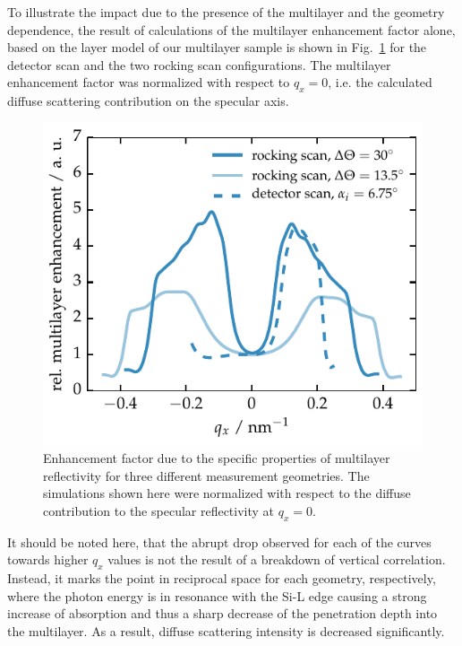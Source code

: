 To illustrate the impact due to the presence of the multilayer and the geometry dependence, the result of calculations of the multilayer enhancement factor alone, based on the layer model of our multilayer sample is shown in Fig.~\ref{ch_diff:fig_PTB17_multilayer_enhancement_factor} for the detector scan and the two rocking scan configurations. The multilayer enhancement factor was normalized with respect to $q_x=0$, i.e. the calculated diffuse scattering contribution on the specular axis.
\begin{figure}[htbp]
	\includegraphics{img/PTB17_multilayer_enhancement_factor} \caption{Enhancement factor due to the specific properties of multilayer reflectivity for three different measurement geometries. The simulations shown here were normalized with respect to the diffuse contribution to the specular reflectivity at $q_x=0$.} \label{ch_diff:fig_PTB17_multilayer_enhancement_factor} 
\end{figure}
It should be noted here, that the abrupt drop observed for each of the curves towards higher $q_x$ values is not the result of a breakdown of vertical correlation. Instead, it marks the point in reciprocal space for each geometry, respectively, where the photon energy is in resonance with the Si-L edge causing a strong increase of absorption and thus a sharp decrease of the penetration depth into the multilayer. As a result, diffuse scattering intensity is decreased significantly.

